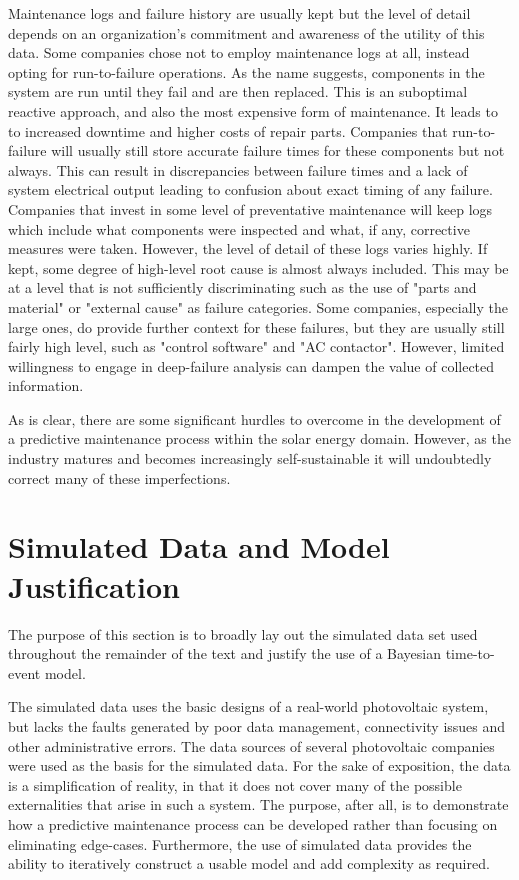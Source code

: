Maintenance logs and failure history are usually kept but the level of detail depends on an organization's commitment and awareness of the utility of this data. Some companies chose not to employ maintenance logs at all, instead opting for run-to-failure operations. As the name suggests, components in the system are run until they fail and are then replaced. This is an suboptimal reactive approach, and also the most expensive form of maintenance. It leads to to increased downtime and higher costs of repair parts\cite{Mobley2002}. Companies that run-to-failure will usually still store accurate failure times for these components but not always. This can result in discrepancies between failure times and a lack of system electrical output leading to confusion about exact timing of any failure\cite{Laukamp2002}. Companies that invest in some level of preventative maintenance will keep logs which include what components were inspected and what, if any, corrective measures were taken. However, the level of detail of these logs varies highly. If kept, some degree of high-level root cause is almost always included. This may be at a level that is not sufficiently discriminating such as the use of "parts and material" or "external cause" as failure categories. Some companies, especially the large ones, do provide further context for these failures, but they are usually still fairly high level, such as "control software" and "AC contactor". However, limited willingness to engage in deep-failure analysis can dampen the value of collected information\cite{Golnas2013}.

As is clear, there are some significant hurdles to overcome in the development of a predictive maintenance process within the solar energy domain. However, as the industry matures and becomes increasingly self-sustainable it will undoubtedly correct many of these imperfections. 

\section{Simulated Data and Model Justification}

The purpose of this section is to broadly lay out the simulated data set used throughout the remainder of the text and justify the use of a Bayesian time-to-event model. 

The simulated data uses the basic designs of a real-world photovoltaic system, but lacks the faults generated by poor data management, connectivity issues and other administrative errors. The data sources of several photovoltaic companies were used as the basis for the simulated data. For the sake of exposition, the data is a simplification of reality, in that it does not cover many of the possible externalities that arise in such a system. The purpose, after all, is to demonstrate how a predictive maintenance process can be developed rather than focusing on eliminating edge-cases. Furthermore, the use of simulated data provides the ability to iteratively construct a usable model and add complexity as required. 

